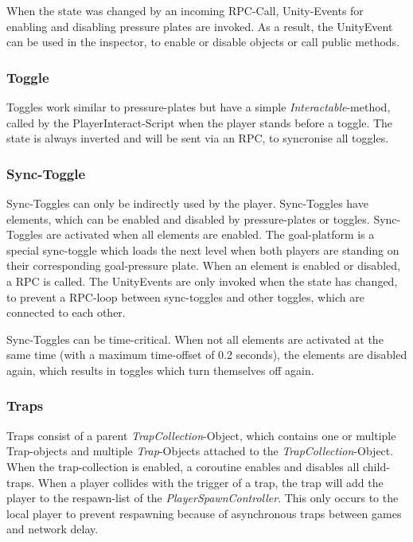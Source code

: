 When the state was changed by an incoming RPC-Call, Unity-Events for enabling and disabling pressure plates are invoked. As a result, the UnityEvent can be used in the inspector, to enable or disable objects or call public methods.

\subsubsection{Toggle}

Toggles work similar to pressure-plates but have a simple \textit{Interactable}-method, called by the PlayerInteract-Script when the player stands before a toggle. The state is always inverted and will be sent via an RPC, to syncronise all toggles.


\subsubsection{Sync-Toggle}

Sync-Toggles can only be indirectly used by the player.
Sync-Toggles have elements, which can be enabled and disabled by pressure-plates or toggles. Sync-Toggles are activated when all elements are enabled. The goal-platform is a special sync-toggle which loads the next level when both players are standing on their corresponding goal-pressure plate.
When an element is enabled or disabled, a RPC is called.
The UnityEvents are only invoked when the state has changed, to prevent a RPC-loop between sync-toggles and other toggles, which are connected to each other.

Sync-Toggles can be time-critical. When not all elements are activated at the same time (with a maximum time-offset of 0.2 seconds), the elements are disabled again, which results in toggles which turn themselves off again.

\subsubsection{Traps}

Traps consist of a parent \textit{TrapCollection}-Object, which contains one or multiple Trap-objects and multiple \textit{Trap}-Objects attached to the \textit{TrapCollection}-Object.
When the trap-collection is enabled, a coroutine enables and disables all child-traps. When a player collides with the trigger of a trap, the trap will add the player to the respawn-list of the \textit{PlayerSpawnController}. This only occurs to the local player to prevent respawning because of asynchronous traps between games and network delay.



